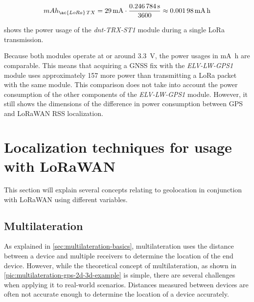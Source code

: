 \begin{equation}\label{eq:dnt-TRX-ST1-tx-consumption}
    mAh_{\ac{LoRa}\,TX} = \SI{29}{\milli\ampere} \cdot \frac{\SI{0.246784}{\second}}{3600} \approx \SI{0.00198}{\milli\ampere\hour}
\end{equation}

 shows the power usage of the \emph{dnt-TRX-ST1} module during a single \ac{LoRa} transmission.

Because both modules operate at or around \SI{3.3}{\volt}, the power usages in \si{\milli\ampere\hour} are comparable.
This means that acquiring a \ac{GNSS} fix with the \emph{ELV-LW-GPS1} module uses approximately \SI{157}{\times} more power than transmitting a \ac{LoRa} packet with the same module.
This comparison does not take into account the power consumption of the other components of the \emph{ELV-LW-GPS1} module.
However, it still shows the dimensions of the difference in power consumption between \ac{GPS} and \ac{LoRaWAN} \ac{RSS} localization.

\section{Localization techniques for usage with \acs{LoRaWAN}}\label{sec:lorawan-localization-techniques}

This section will explain several concepts relating to geolocation in conjunction with \ac{LoRaWAN} using different variables.

\subsection{Multilateration}\label{sec:lorawan-multilateration}

As explained in \cref{sec:multilateration-basics}, multilateration uses the distance between a device and multiple receivers to determine the location of the end device.
However, while the theoretical concept of multilateration, as shown in \cref{pic:multilateration-gps-2d-3d-example} is simple, there are several challenges when applying it to real-world scenarios.
Distances measured between devices are often not accurate enough to determine the location of a device accurately.

